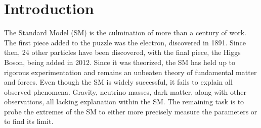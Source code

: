 \chapter{Introduction}
The Standard Model (SM) is the culmination of more than a century of work. The first piece added to the puzzle was the electron, discovered in 1891. Since then, 24 other particles have been discovered, with the final piece, the Higgs Boson, being added in 2012. Since it was theorized, the SM has held up to rigorous experimentation and remains an unbeaten theory of fundamental matter and forces. Even though the SM is widely successful, it fails to explain all observed phenomena. Gravity, neutrino masses, dark matter, along with other observations, all lacking explanation within the SM. The remaining task is to probe the extremes of the SM to either more precisely measure the parameters or to find its limit.
